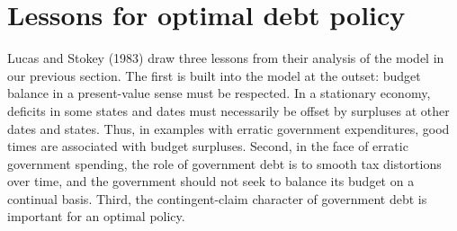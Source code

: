 \section{Lessons for optimal debt policy}\label{LS_lessons_debt}
Lucas and Stokey (1983)
draw three lessons from their analysis of the model in our previous section. The
first is built into the model at the outset: budget balance in a present-value
 sense must be respected. In a stationary economy,  deficits in some states and dates must
 necessarily be offset by  surpluses
at other dates and states. Thus, in  examples with erratic government expenditures,
good times are associated with budget surpluses. Second, in the face of
erratic government spending, the role of government debt is to smooth
tax distortions over time, and the government should not seek
to balance its budget on a continual basis. Third, the
contingent-claim character of government debt is important for an
optimal policy.

